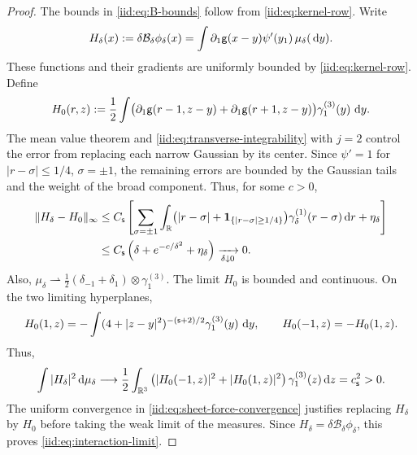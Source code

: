 \documentclass[11pt,reqno]{amsart}
\numberwithin{equation}{section}
\theoremstyle{plain}
\theoremstyle{remark}
\DeclarePairedDelimiter{\norm}{\lVert}{\rVert}
\begin{document}
\begin{proof}
The bounds in \eqref{iid:eq:B-bounds} follow from \eqref{iid:eq:kernel-row}. Write
\begin{equation}\label{iid:eq:Hdelta}
 H_\delta(x):=\delta \mathcal B_\delta\phi_\delta(x)
 =\int\partial_1\mathsf g(x-y)\psi'(y_1)\,\mu_\delta(\,\mathrm d y).
\end{equation}
These functions and their gradients are uniformly bounded by \eqref{iid:eq:kernel-row}. Define
\begin{equation}\label{iid:eq:Hlimit}
 H_0(r,z):=\frac12\int\bigl(\partial_1\mathsf g(r-1,z-y)
 +\partial_1\mathsf g(r+1,z-y)\bigr)\gamma_1^{(3)}(y)\,\,\mathrm d y.
\end{equation}
The mean value theorem and \eqref{iid:eq:transverse-integrability} with $j=2$ control the error from replacing each narrow Gaussian by its center. Since $\psi'=1$ for $|r-\sigma|\le1/4$, $\sigma=\pm1$, the remaining errors are bounded by the Gaussian tails and the weight of the broad component. Thus, for some $c>0$,
\begin{align}\label{iid:eq:sheet-force-convergence}
 \norm{H_\delta-H_0}_\infty
 &\le C_\s\left[\sum_{\sigma=\pm1}\int_\R
 \bigl(|r-\sigma|+\mathbf1_{\{|r-\sigma|\ge1/4\}}\bigr)
 \gamma_\delta^{(1)}(r-\sigma)\dd r+\eta_\delta\right]\notag\\
 &\le C_\s\left(\delta+e^{-c/\delta^2}+\eta_\delta\right)
 \xrightarrow[\delta\downarrow0]{}0.
\end{align}
Also, $\mu_\delta\rightharpoonup\tfrac12(\delta_{-1}+\delta_1)\otimes\gamma_1^{(3)}$. The limit $H_0$ is bounded and continuous. On the two limiting hyperplanes,
\begin{equation}\label{iid:eq:sheet-values}
 H_0(1,z)=-\int(4+|z-y|^2)^{-(\mathsf{s}+2)/2}\gamma_1^{(3)}(y)\,\,\mathrm d y,
 \qquad H_0(-1,z)=-H_0(1,z).
\end{equation}
Thus,
\begin{equation}\label{iid:eq:interaction-norm-limit}
 \int |H_\delta|^2\,\mathrm d\mu_\delta
 \longrightarrow\frac12\int_{\mathbb R^3}
 \left(|H_0(-1,z)|^2+|H_0(1,z)|^2\right)\gamma_1^{(3)}(z)\,\mathrm d z
 =c_{\mathsf{s}}^2>0.
\end{equation}
The uniform convergence in \eqref{iid:eq:sheet-force-convergence} justifies replacing $H_\delta$ by $H_0$ before taking the weak limit of the measures. Since $H_\delta=\delta\mathcal B_\delta\phi_\delta$, this proves \eqref{iid:eq:interaction-limit}.
\end{proof}
\end{document}
